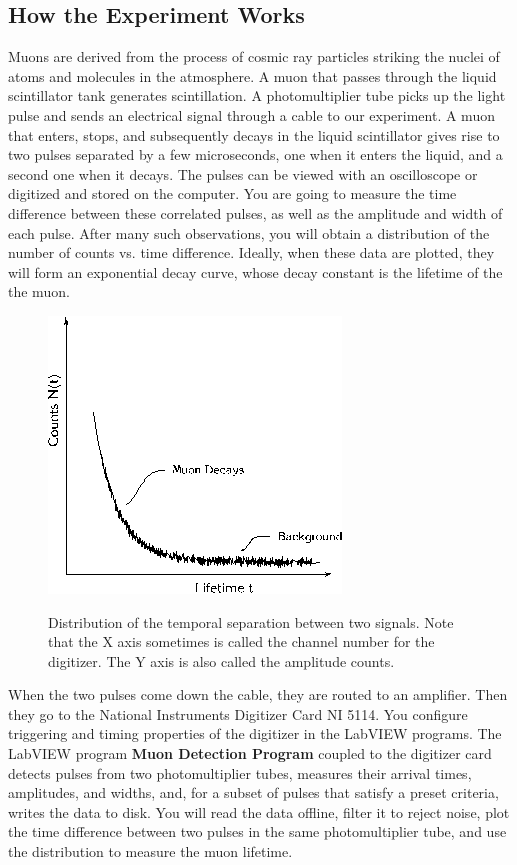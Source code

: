 \documentclass{../lab}
\begin{document}
\subsection{How the Experiment Works}

\newpage

Muons are derived from the process of cosmic ray particles striking the nuclei of atoms and molecules in the atmosphere. A muon that passes through the liquid scintillator tank generates scintillation. A photomultiplier tube picks up the light pulse and sends an electrical signal through a cable to our experiment. A muon that enters, stops, and subsequently decays in the liquid scintillator gives rise to two pulses separated by a few microseconds, one when it enters the liquid, and a second one when it decays. The pulses can be viewed with an oscilloscope or digitized and stored on the computer. You are going to measure the time difference between these correlated pulses, as well as the amplitude and width of each pulse. After many such observations, you will obtain a distribution of the number of counts vs. time difference. Ideally, when these data are plotted, they will form an exponential decay curve, whose decay constant is the lifetime of the the muon.

\begin{figure}[h]
    \centering
    \href{http://experimentationlab.berkeley.edu/sites/default/files/images/MUOimage008.gif}{\includegraphics[width=0.5\linewidth]{images/MUOimage008.png}}
    \caption{Distribution of the temporal separation between two signals.  Note that the X axis  sometimes is called the channel number for the digitizer. The Y axis is also called the amplitude counts.}
    \label{fig:MUOimage008}
\end{figure}

When the two pulses come down the cable, they are routed to an amplifier. Then they go to the National Instruments Digitizer Card NI 5114. You configure triggering and timing properties of the digitizer in the LabVIEW programs. The LabVIEW program \textbf{Muon Detection Program} coupled to the digitizer card detects pulses from two photomultiplier tubes, measures their arrival times, amplitudes, and widths, and, for a subset of pulses that satisfy a preset criteria, writes the data to disk. You will read the data offline, filter it to reject noise, plot the time difference between two pulses in the same photomultiplier tube, and use the distribution to measure the muon lifetime.
\end{document}
